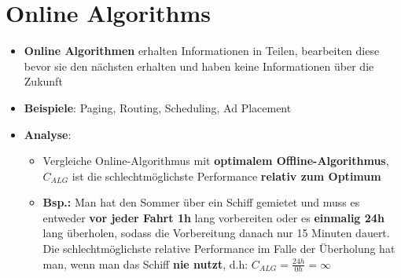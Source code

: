 \section{Online Algorithms}%
\label{oa:sec:online_algorithms}

\begin{itemize}
	\item \textbf{Online Algorithmen} erhalten Informationen in Teilen, bearbeiten diese bevor sie den nächsten erhalten und haben keine Informationen über die Zukunft
	\item \textbf{Beispiele}: Paging, Routing, Scheduling, Ad Placement
	\item \textbf{Analyse}:
	\begin{itemize}
		\item Vergleiche Online-Algorithmus mit \textbf{optimalem Offline-Algorithmus}, $C_{ALG}$ ist die schlechtmöglichste Performance \textbf{relativ zum Optimum}
		\item \textbf{Bsp.:} Man hat den Sommer über ein Schiff gemietet und muss es entweder \textbf{vor jeder Fahrt 1h} lang vorbereiten oder es \textbf{einmalig 24h} lang überholen, sodass die Vorbereitung danach nur 15 Minuten dauert. Die schlechtmöglichste relative Performance im Falle der Überholung hat man, wenn man das Schiff \textbf{nie nutzt}, d.h: $C_{ALG} = \frac{24h}{0h} = \infty$
	\end{itemize}
\end{itemize}